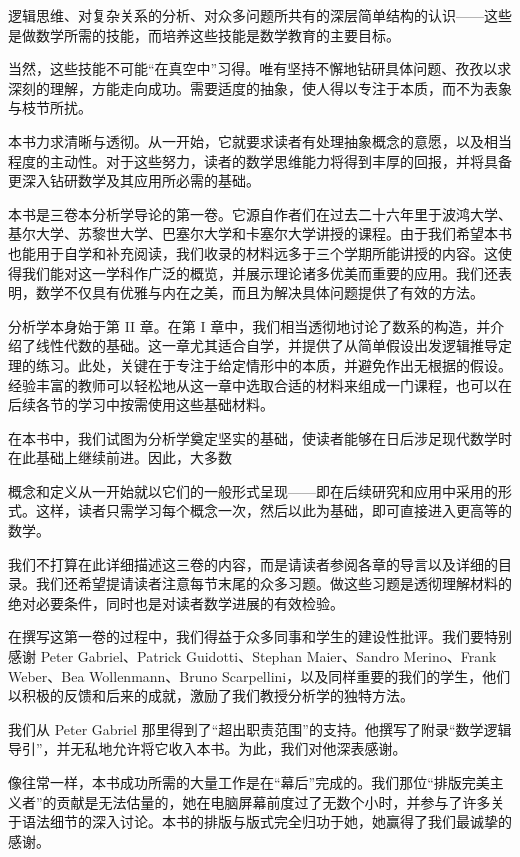 逻辑思维、对复杂关系的分析、对众多问题所共有的深层简单结构的认识——这些是做数学所需的技能，而培养这些技能是数学教育的主要目标。

当然，这些技能不可能“在真空中”习得。唯有坚持不懈地钻研具体问题、孜孜以求深刻的理解，方能走向成功。需要适度的抽象，使人得以专注于本质，而不为表象与枝节所扰。

本书力求清晰与透彻。从一开始，它就要求读者有处理抽象概念的意愿，以及相当程度的主动性。对于这些努力，读者的数学思维能力将得到丰厚的回报，并将具备更深入钻研数学及其应用所必需的基础。

本书是三卷本分析学导论的第一卷。它源自作者们在过去二十六年里于波鸿大学、基尔大学、苏黎世大学、巴塞尔大学和卡塞尔大学讲授的课程。由于我们希望本书也能用于自学和补充阅读，我们收录的材料远多于三个学期所能讲授的内容。这使得我们能对这一学科作广泛的概览，并展示理论诸多优美而重要的应用。我们还表明，数学不仅具有优雅与内在之美，而且为解决具体问题提供了有效的方法。

分析学本身始于第 II 章。在第 I 章中，我们相当透彻地讨论了数系的构造，并介绍了线性代数的基础。这一章尤其适合自学，并提供了从简单假设出发逻辑推导定理的练习。此处，关键在于专注于给定情形中的本质，并避免作出无根据的假设。经验丰富的教师可以轻松地从这一章中选取合适的材料来组成一门课程，也可以在后续各节的学习中按需使用这些基础材料。

在本书中，我们试图为分析学奠定坚实的基础，使读者能够在日后涉足现代数学时在此基础上继续前进。因此，大多数

概念和定义从一开始就以它们的一般形式呈现——即在后续研究和应用中采用的形式。这样，读者只需学习每个概念一次，然后以此为基础，即可直接进入更高等的数学。

我们不打算在此详细描述这三卷的内容，而是请读者参阅各章的导言以及详细的目录。我们还希望提请读者注意每节末尾的众多习题。做这些习题是透彻理解材料的绝对必要条件，同时也是对读者数学进展的有效检验。

在撰写这第一卷的过程中，我们得益于众多同事和学生的建设性批评。我们要特别感谢 Peter Gabriel、Patrick Guidotti、Stephan Maier、Sandro Merino、Frank Weber、Bea Wollenmann、Bruno Scarpellini，以及同样重要的我们的学生，他们以积极的反馈和后来的成就，激励了我们教授分析学的独特方法。

我们从 Peter Gabriel 那里得到了“超出职责范围”的支持。他撰写了附录“数学逻辑导引”，并无私地允许将它收入本书。为此，我们对他深表感谢。

像往常一样，本书成功所需的大量工作是在“幕后”完成的。我们那位“排版完美主义者”的贡献是无法估量的，她在电脑屏幕前度过了无数个小时，并参与了许多关于语法细节的深入讨论。本书的排版与版式完全归功于她，她赢得了我们最诚挚的感谢。

